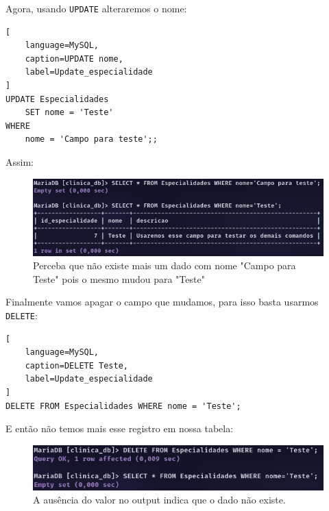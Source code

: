 Agora, usando \texttt{UPDATE} alteraremos o nome:

\begin{lstlisting}[
    language=MySQL,
    caption=UPDATE nome,
    label=Update_especialidade
]
UPDATE Especialidades 
    SET nome = 'Teste'
WHERE
    nome = 'Campo para teste';;
\end{lstlisting}

Assim:

\begin{figure}[H]
    \centering
    \includegraphics[width=1\linewidth]{Text//DML/campo_teste2.png}
    \caption{Perceba que não existe mais um dado com nome "Campo para Teste" pois o mesmo mudou para "Teste"}
    \label{fig:CampoTeste2}
\end{figure}

Finalmente vamos apagar o campo que mudamos, para isso basta usarmos \texttt{DELETE}:
\begin{lstlisting}[
    language=MySQL,
    caption=DELETE Teste,
    label=Update_especialidade
]
DELETE FROM Especialidades WHERE nome = 'Teste';
\end{lstlisting}

E então não temos mais esse registro em nossa tabela:

\begin{figure}[H]
    \centering
    \includegraphics[width=1\linewidth]{Text/DML/Delete_teste.png}
    \caption{A ausência do valor no output indica que o dado não existe.}
\end{figure}
